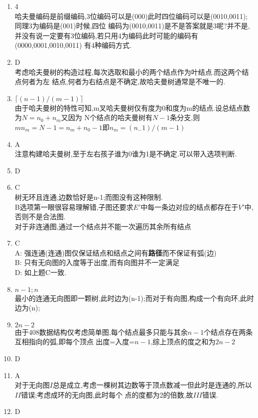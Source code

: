 \documentclass[12pt, a4paper, oneside, UTF8]{ctexbook}
\begin{document}
\begin{enumerate}
    \item 4 \\
    哈夫曼编码是前缀编码,3位编码可以是(000)此时四位编码可以是(0010,0011);同理3为编码是(001)时候,四位
    编码为(0010,0011)是不是答案就是3呢?并不是,并没有说一定要有3位编码,若只用4为编码此时可能的编码有(0000,0001,0010,0011)
    有4种编码方式. 
    \item D \\
    考虑哈夫曼树的构造过程,每次选取和最小的两个结点作为叶结点.而这两个结点何者为左
    结点,何者为右结点是不确定,故哈夫曼树通常是不唯一的. 
    \item $\lceil(n-1)/(m-1)\rceil$ \\
    由于哈夫曼树的特性可知,m叉哈夫曼树仅有度为0和度为m的结点.设总结点数为$N=n_0+n_m$又因为
    N个结点的哈夫曼树有$N-1$条分支,则$mn_m=N-1=n_m+n_0-1$即$n_m=(n_-1)/(m-1)$
    \item A \\
    注意构建哈夫曼树,至于左右孩子谁为0谁为1是不确定.可以带入选项判断. 
    \item D
    \item C \\
    树无环且连通,边数恰好是n-1;而图没有这种限制. \\
    B选项第一眼很容易理解错,子图还要求$E'$中每一条边对应的结点都存在于$V'$中,否则不是合法图. \\
    对于非连通图,通过一个结点并不能一次遍历其余所有结点 
    \item C \\
    A: 强连通(连通)图仅保证结点和结点之间有\textbf{路径}而不保证有弧(边) \\
    B: 只有无向图的入度等于出度,而有向图并不一定满足 \\
    D: 如上题C一致.  
    \item $n-1;n$ \\
    最小的连通无向图即一颗树,此时边为(n-1);而对于有向图,构成一个有向环,此时边为(n);
    \item $2n-2$ \\
    由于408数据结构仅考虑简单图,每个结点最多只能与其余$n-1$个结点存在两条互相指向的弧,即每个顶点
    出度=入度=$n-1$,综上顶点的度之和为$2n-2$ 
    \item D 
    \item A \\
    对于无向图$I$总是成立,考虑一棵树其边数等于顶点数减一但此时是连通的,所以$II$错误;考虑成环的无向图,此时每个
    点的度都为2的倍数,故$III$错误. 
    \item D \\

\end{enumerate}
\end{document}
